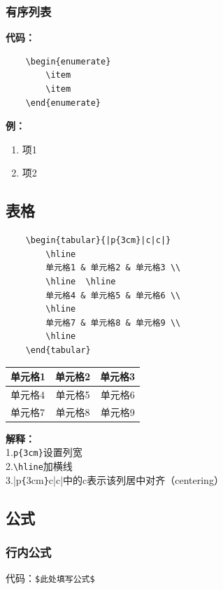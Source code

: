 \documentclass[UTF8]{ctexart}
\begin{document}
\subsubsection{有序列表} 
\textbf{代码：}
\begin{lstlisting}
    \begin{enumerate}
        \item
        \item
    \end{enumerate}
    \end{lstlisting}
\qquad \textbf{例：}
\begin{enumerate}
    \item 项1
    \item 项2
\end{enumerate}

\subsection{表格} 
\begin{lstlisting}
    \begin{tabular}{|p{3cm}|c|c|}
        \hline
        单元格1 & 单元格2 & 单元格3 \\
        \hline  \hline
        单元格4 & 单元格5 & 单元格6 \\
        \hline
        单元格7 & 单元格8 & 单元格9 \\
        \hline
    \end{tabular}
\end{lstlisting}
\begin{tabular}{|p{3cm}|c|c|}
    \hline
    单元格1 & 单元格2 & 单元格3 \\
    \hline  \hline
    单元格4 & 单元格5 & 单元格6 \\
    \hline
    单元格7 & 单元格8 & 单元格9 \\
    \hline
\end{tabular}\bigskip

\textbf{解释：}\\
1.\verb|p{3cm}|设置列宽\\
2.\verb|\hline|加横线\\
3.|p\verb|{|3cm\verb|}|c|c|中的c表示该列居中对齐（centering）



\subsection{公式}
\subsubsection{行内公式}
代码：\verb|$此处填写公式$|
\end{document}
